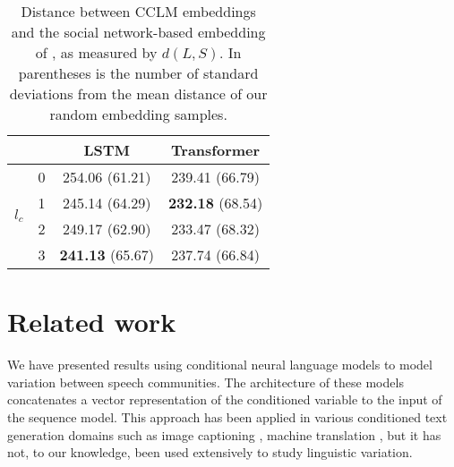 \documentclass[11pt]{article}
\begin{document}
\begin{table}
\centering
\begin{tabular}{llcc}
\toprule
                        &   & LSTM     & Transformer \\
\midrule
  \multirow{4}{*}{$l_c$}  & 0 &         254.06  (61.21) &         239.41  (66.79)  \\
                          & 1 &         245.14  (64.29) & \textbf{232.18} (68.54)   \\
                          & 2 &         249.17  (62.90) &         233.47  (68.32)  \\
                          & 3 & \textbf{241.13} (65.67) &         237.74   (66.84) \\
\bottomrule
\end{tabular}
\caption{Distance between CCLM embeddings and the social network-based embedding
of \citet{Kumar2018}, as measured by $d(L,S)$. In parentheses is the number of standard deviations
from the mean distance of our random embedding samples.} \label{tab:embedding-correlations}
\end{table}






\section{Related work}\label{sec:related-work}

We have presented results using conditional neural language models
to model variation between speech communities.
The architecture of these models concatenates a vector representation
of the conditioned variable to the input of the sequence model.
This approach has been applied in various conditioned text generation domains such as 
image captioning \citep{Vinyals2015}, machine translation \citep{Kalchbrenner2013},
but it has not, to our knowledge, been used extensively to study linguistic variation.
\end{document}
